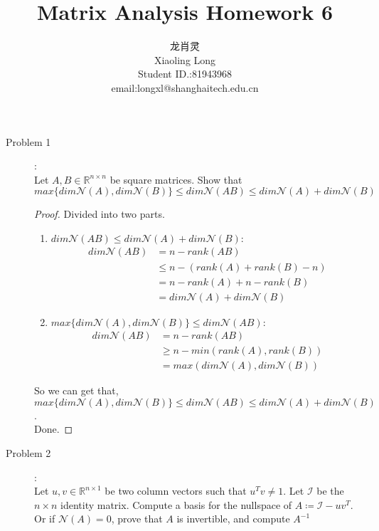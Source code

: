 \documentclass[a4paper]{article}
\title{Matrix Analysis Homework 6}
\author{龙肖灵 \\Xiaoling Long\\Student ID.:81943968\\email:longxl@shanghaitech.edu.cn}
\begin{document}
\maketitle

\begin{description}
  \item[Problem 1]:\\
  Let $A,B\in\mathbb{R}^{n\times n}$ be square matrices. Show that\\
  $max\{dim\mathcal{N}(A),dim\mathcal{N}(B)\}\leq dim\mathcal{N}(AB)\leq dim\mathcal{N}(A)+dim\mathcal{N}(B)$

  \begin{proof}
    Divided into two parts.
    \begin{enumerate}[1)]
      \item $dim\mathcal{N}(AB)\leq dim\mathcal{N}(A)+dim\mathcal{N}(B)$:
      \begin{align*}
        dim\mathcal{N}(AB)&=n-rank(AB)\\
        &\leq n-(rank(A)+rank(B)-n)\\
        &=n-rank(A)+n-rank(B)\\
        &=dim\mathcal{N}(A)+dim\mathcal{N}(B)
      \end{align*}
      \item $max\{dim\mathcal{N}(A),dim\mathcal{N}(B)\}\leq dim\mathcal{N}(AB)$:
      \begin{align*}
        dim\mathcal{N}(AB)&=n-rank(AB)\\
        &\ge n-min(rank(A),rank(B))\\
        &=max(dim\mathcal{N}(A),dim\mathcal{N}(B))
      \end{align*}
    \end{enumerate}
          So we can get that, $max\{dim\mathcal{N}(A),dim\mathcal{N}(B)\}\leq dim\mathcal{N}(AB)\leq dim\mathcal{N}(A)+dim\mathcal{N}(B)$.\\
          Done.
  \end{proof}

  \item[Problem 2]:\\
   Let $u,v\in\mathbb{R}^{n\times 1}$ be two column vectors such that $u^Tv\neq 1$. Let $\mathcal{I}$ be the $n\times n$ identity matrix. Compute a basis for the nullspace of $A\coloneqq \mathcal{I} - uv^T$. Or if $\mathcal{N}(A) = 0$, prove that $A$ is invertible, and compute $A^{-1}$


\end{description}
\end{document}
